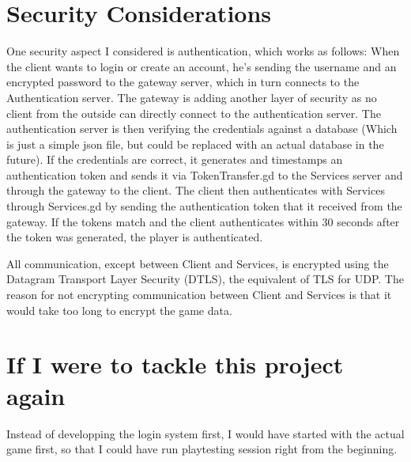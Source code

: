\documentclass{article}
\begin{document}
\section{Security Considerations}
One security aspect I considered is authentication, which works as follows:  When the client wants to login or create an account, he's sending the username and an encrypted password to the gateway server, which in turn connects to the Authentication server. The gateway is adding another layer of security as no client from the outside can directly connect to the authentication server. The authentication server is then verifying the credentials against a database (Which is just a simple json file, but could be replaced with an actual database in the future). If the credentials are correct, it generates and timestamps an authentication token and sends it via TokenTransfer.gd to the Services server and through the gateway to the client. The client then authenticates with Services through Services.gd by sending the authentication token that it received from the gateway. If the tokens match and the client authenticates within 30 seconds after the token was generated, the player is authenticated. 

All communication, except between Client and Services, is encrypted using the Datagram Transport Layer Security (DTLS), the equivalent of TLS for UDP. The reason for not encrypting communication between Client and Services is that it would take too long to encrypt the game data.

\section{If I were to tackle this project again}
Instead of developping the login system first, I would have started with the actual game first, so that I could have run playtesting session right from the beginning.
\end{document}

